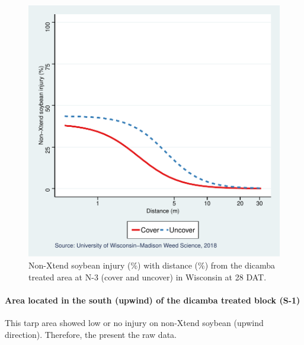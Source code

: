 \documentclass[]{article}
\let\oldparagraph\paragraph
\renewcommand{\paragraph}[1]{\oldparagraph{#1}\mbox{}}
\begin{document}
\begin{figure}
\centering
\includegraphics{Report_Dicamba_study_files/figure-latex/unnamed-chunk-101-1.pdf}
\caption{Non-Xtend soybean injury (\%) with distance (\%) from the
dicamba treated area at N-3 (cover and uncover) in Wisconsin at 28 DAT.}
\end{figure}

\pagebreak

\paragraph{Area located in the south (upwind) of the dicamba treated
block
(S-1)}\label{area-located-in-the-south-upwind-of-the-dicamba-treated-block-s-1}

This tarp area showed low or no injury on non-Xtend soybean (upwind
direction). Therefore, the present the raw data.
\end{document}
